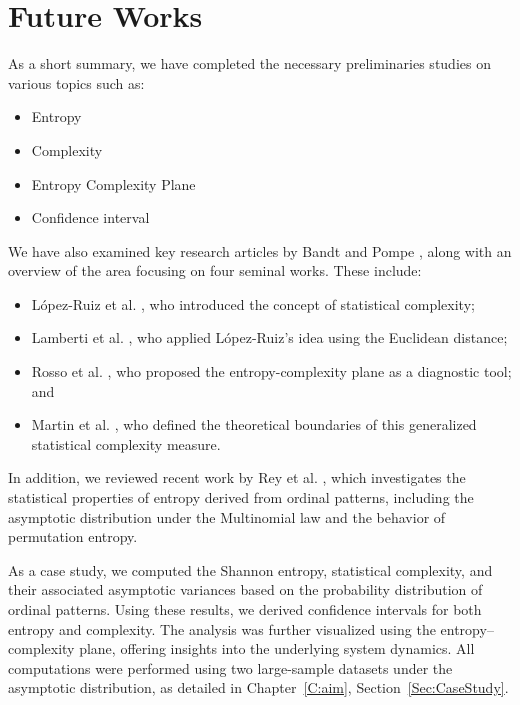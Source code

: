 \chapter{Future Works}\label{C:futw}

As a short summary, we have completed the necessary preliminaries studies on various topics such as:
\begin{itemize}
    \item Entropy
    \item Complexity
    \item Entropy Complexity Plane
    \item Confidence interval
\end{itemize}

We have also examined key research articles by Bandt and Pompe \cite{PhysRevLett.88.174102}, along with an overview of the area focusing on four seminal works. These include:
\begin{itemize}
	\item López-Ruiz et al. \cite{lopez1995statistical}, who introduced the concept of statistical complexity;
	\item Lamberti et al. \cite{lamberti2004intensive}, who applied López-Ruiz's idea using the Euclidean distance;
	\item Rosso et al. \cite{EEGAnalysisUsingWaveletBasedInformationTools}, who proposed the entropy-complexity plane as a diagnostic tool; and
	\item Martin et al. \cite{Martin2006}, who defined the theoretical boundaries of this generalized statistical complexity measure.
\end{itemize}

In addition, we reviewed recent work by Rey et al. \cite{Rey2025,Rey2023a,Rey2023}, which investigates the statistical properties of entropy derived from ordinal patterns, including the asymptotic distribution under the Multinomial law and the behavior of permutation entropy. 

As a case study, we computed the Shannon entropy, statistical complexity, and their associated asymptotic variances based on the probability distribution of ordinal patterns. Using these results, we derived confidence intervals for both entropy and complexity. The analysis was further visualized using the entropy–complexity plane, offering insights into the underlying system dynamics. All computations were performed using two large-sample datasets under the asymptotic distribution, as detailed in Chapter~\ref{C:aim}, Section~\ref{Sec:CaseStudy}. 


